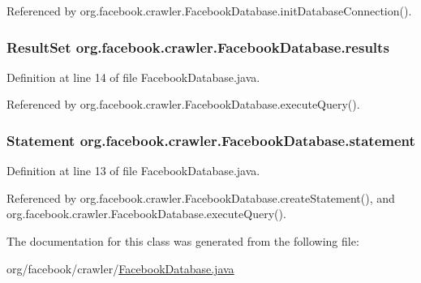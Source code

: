 Referenced by org.\-facebook.\-crawler.\-Facebook\-Database.\-init\-Database\-Connection().

\hypertarget{classorg_1_1facebook_1_1crawler_1_1_facebook_database_af817784677223d8e6830d7040eb33784}{
\subsubsection[{results}]{\setlength{\rightskip}{0pt plus 5cm}Result\-Set org.\-facebook.\-crawler.\-Facebook\-Database.\-results\hspace{0.3cm}{\ttfamily [private]}}}\label{classorg_1_1facebook_1_1crawler_1_1_facebook_database_af817784677223d8e6830d7040eb33784}


Definition at line 14 of file Facebook\-Database.\-java.



Referenced by org.\-facebook.\-crawler.\-Facebook\-Database.\-execute\-Query().

\hypertarget{classorg_1_1facebook_1_1crawler_1_1_facebook_database_abba52e41f81d0010005388541288096d}{
\subsubsection[{statement}]{\setlength{\rightskip}{0pt plus 5cm}Statement org.\-facebook.\-crawler.\-Facebook\-Database.\-statement\hspace{0.3cm}{\ttfamily [private]}}}\label{classorg_1_1facebook_1_1crawler_1_1_facebook_database_abba52e41f81d0010005388541288096d}


Definition at line 13 of file Facebook\-Database.\-java.



Referenced by org.\-facebook.\-crawler.\-Facebook\-Database.\-create\-Statement(), and org.\-facebook.\-crawler.\-Facebook\-Database.\-execute\-Query().



The documentation for this class was generated from the following file\-:\begin{DoxyCompactItemize}
\item 
org/facebook/crawler/\hyperlink{_facebook_database_8java}{Facebook\-Database.\-java}\end{DoxyCompactItemize}
